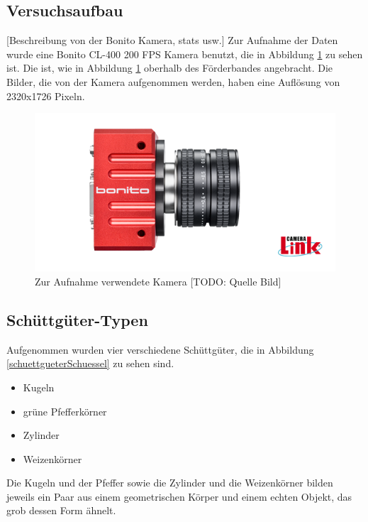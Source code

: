 \subsection{Versuchsaufbau}

[Beschreibung von der Bonito Kamera, stats usw.]
Zur Aufnahme der Daten wurde eine Bonito CL-400 200 FPS Kamera benutzt, die in Abbildung \ref{pictureCam} zu sehen ist.
Die ist, wie in Abbildung \ref{pictureCam} oberhalb des Förderbandes angebracht.
Die Bilder, die von der Kamera aufgenommen werden, haben eine Auflösung von 2320x1726 Pixeln.

\begin{figure}
    \centering
    \includegraphics[width=\textwidth]{img/banner-Bonito_cropped}
    \caption{Zur Aufnahme verwendete Kamera [TODO: Quelle Bild]}
    \label{pictureCam}
\end{figure}

\subsection{Schüttgüter-Typen}

Aufgenommen wurden vier verschiedene Schüttgüter, die in Abbildung \ref{schuettgueterSchuessel} zu sehen sind.

\begin{itemize}
    \item Kugeln
    \item grüne Pfefferkörner
    \item Zylinder
    \item Weizenkörner
\end{itemize}

Die Kugeln und der Pfeffer sowie die Zylinder und die Weizenkörner bilden jeweils 
ein Paar aus einem geometrischen Körper und einem echten Objekt, das grob dessen Form ähnelt.

